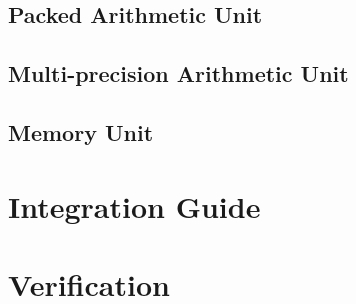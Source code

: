 \documentclass{article}
\begin{document}
\subsection{Packed Arithmetic Unit}

\subsection{Multi-precision Arithmetic Unit}

\subsection{Memory Unit}


\section{Integration Guide}
\label{sec:integration}


\section{Verification}
\label{sec:verification}


\printbibliography
\end{document}
